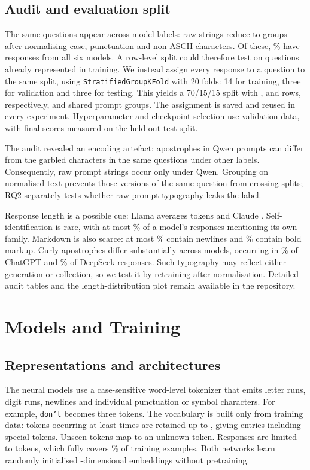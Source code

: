 \documentclass[11pt]{article}
\begin{document}
\subsection{Audit and evaluation split}
The same questions appear across model labels: \PromptsRaw{} raw strings reduce to \PromptGroups{} groups
after normalising case, punctuation and non-ASCII characters. Of these, \GroupsAllSixPct\% have responses
from all six models. A row-level split could therefore test on questions already represented in training.
We instead assign every response to a question to the same split, using \texttt{StratifiedGroupKFold} with
20 folds: 14 for training, three for validation and three for testing. This yields a 70/15/15 split with
\TrainRows{}, \ValRows{} and \TestRows{} rows, respectively, and \GroupsSharedBetweenSplits{} shared prompt
groups. The assignment is saved and reused in every experiment. Hyperparameter and checkpoint selection
use validation data, with final scores measured on the held-out test split.

The audit revealed an encoding artefact: apostrophes in Qwen prompts can differ from the garbled characters
in the same questions under other labels. Consequently, \QwenUniquePrompts{} raw prompt strings occur
only under Qwen. Grouping on normalised text prevents those versions of the same question from crossing
splits; RQ2 separately tests whether raw prompt typography leaks the label.

Response length is a possible cue: Llama averages \ShortestModelTokens{} tokens and Claude
\LongestModelTokens{}. Self-identification is rare, with at most \MaxOwnFamilyPct\% of a model's responses
mentioning its own family. Markdown is also scarce: at most \MaxNewlinePct\% contain newlines and
\MaxBoldPct\% contain bold markup. Curly apostrophes differ substantially across models, occurring in
\CurlyAposChatGPT\% of ChatGPT and \CurlyAposDeepSeek\% of DeepSeek responses. Such typography may reflect
either generation or collection, so we test it by retraining after normalisation. Detailed audit tables
and the length-distribution plot remain available in the repository.

\section{Models and Training}
\label{sec:models}
\subsection{Representations and architectures}
The neural models use a case-sensitive word-level tokenizer that emits letter runs, digit runs, newlines
and individual punctuation or symbol characters. For example, \texttt{don't} becomes three tokens.
The vocabulary is built only from training data: tokens occurring at least \MinFreq{} times are retained
up to \MaxVocab{}, giving \VocabSize{} entries including special tokens. Unseen tokens map to an unknown
token. Responses are limited to \MaxLen{} tokens, which fully covers \CoverageMaxLen\% of training examples.
Both networks learn randomly initialised \EmbDim-dimensional embeddings without pretraining.
\end{document}
